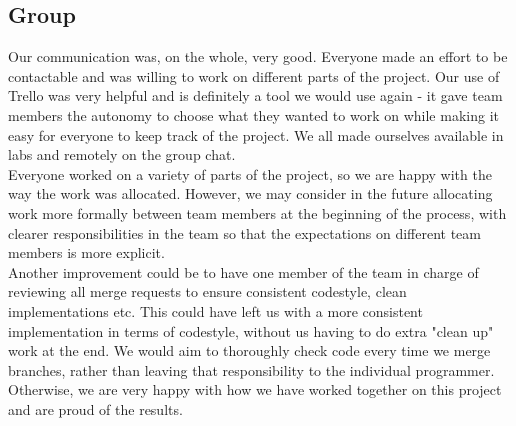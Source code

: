\documentclass{article}
\begin{document}
\subsection{Group}
Our communication was, on the whole, very good. Everyone made an effort to be contactable and was willing to work on different parts of the project. Our use of Trello was very helpful and is definitely a tool we would use again - it gave team members the autonomy to choose what they wanted to work on while making it easy for everyone to keep track of the project. We all made ourselves available in labs and remotely on the group chat.\\
Everyone worked on a variety of parts of the project, so we are happy with the way the work was allocated. However, we may consider in the future allocating work more formally between team members at the beginning of the process, with clearer responsibilities in the team so that the expectations on different team members is more explicit.\\
Another improvement could be to have one member of the team in charge of reviewing all merge requests to ensure consistent codestyle, clean implementations etc. This could have left us with a more consistent implementation in terms of codestyle, without us having to do extra "clean up" work at the end. We would aim to thoroughly check code every time we merge branches, rather than leaving that responsibility to the individual programmer.\\
Otherwise, we are very happy with how we have worked together on this project and are proud of the results.
\end{document}
